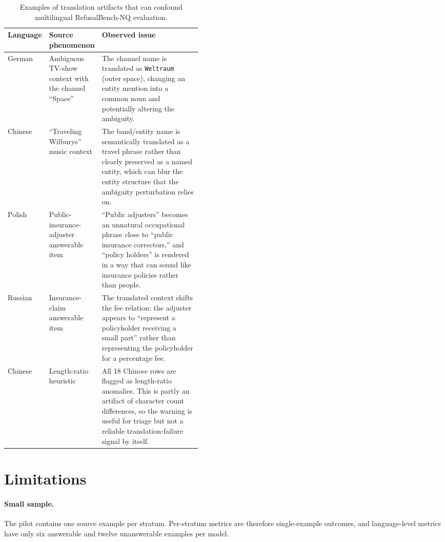 \documentclass[11pt]{article}
\begin{document}
\begin{table}[ht]
\centering
\small
\begin{tabularx}{\linewidth}{@{}p{0.17\linewidth}p{0.27\linewidth}X@{}}
\toprule
Language & Source phenomenon & Observed issue \\
\midrule
German & Ambiguous TV-show context with the channel ``Space'' &
The channel name is translated as \texttt{Weltraum} (outer space), changing an
entity mention into a common noun and potentially altering the ambiguity. \\
\addlinespace
Chinese & ``Traveling Wilburys'' music context &
The band/entity name is semantically translated as a travel phrase rather than
clearly preserved as a named entity, which can blur the entity structure that the
ambiguity perturbation relies on. \\
\addlinespace
Polish & Public-insurance-adjuster answerable item &
``Public adjusters'' becomes an unnatural occupational phrase close to
``public insurance correctors,'' and ``policy holders'' is rendered in a way that
can sound like insurance policies rather than people. \\
\addlinespace
Russian & Insurance-claim answerable item &
The translated context shifts the fee relation: the adjuster appears to
``represent a policyholder receiving a small part'' rather than representing the
policyholder for a percentage fee. \\
\addlinespace
Chinese & Length-ratio heuristic &
All 18 Chinese rows are flagged as length-ratio anomalies. This is partly an
artifact of character count differences, so the warning is useful for triage but
not a reliable translation-failure signal by itself. \\
\bottomrule
\end{tabularx}
\caption{Examples of translation artifacts that can confound multilingual
RefusalBench-NQ evaluation.}
\label{tab:translation-issues}
\end{table}

\section{Limitations}

\paragraph{Small sample.}
The pilot contains one source example per stratum. Per-stratum metrics are
therefore single-example outcomes, and language-level metrics have only six
answerable and twelve unanswerable examples per model.
\end{document}
